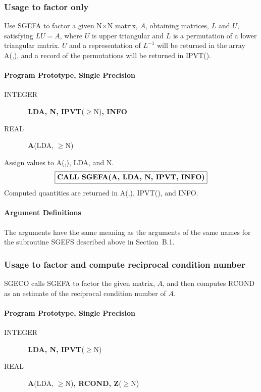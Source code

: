 \documentclass[twoside]{MATH77}
\begin{document}
\subsubsection{Usage to factor only}

Use SGEFA to factor a given N$\times $N matrix, $A$, obtaining matrices, $L$
and $U$, satisfying $LU =A$, where $U$ is upper triangular and $L$ is a
permutation of a lower triangular matrix. $U$ and a representation
of $L^{-1}$ will be returned in the array A(,), and a record of the
permutations will be returned in IPVT().

\paragraph{Program Prototype, Single Precision}

\begin{description}

\item[INTEGER] \ {\bf LDA, N, IPVT}($\geq $N){\bf , INFO}

\item[REAL] \ {\bf A}(LDA, $\geq $N)

\end{description}

Assign values to A(,), LDA, and N.
$$
\fbox{\bf CALL SGEFA(A, LDA, N, IPVT, INFO)}
$$
Computed quantities are returned in A(,), IPVT(), and INFO.

\paragraph{Argument Definitions}

The arguments have the same meaning as the arguments of the same names for
the subroutine SGEFS described above in Section~B.1.

\subsubsection{Usage to factor and compute reciprocal condition number}

SGECO calls SGEFA to factor the given matrix, $A$, and then computes RCOND as
an estimate of the reciprocal condition number of $A$.

\paragraph{Program Prototype, Single Precision}

\begin{description}

\item[INTEGER] \ {\bf LDA, N, IPVT}($\geq $N)

\item[REAL] \ {\bf A}(LDA, $\geq $N){\bf , RCOND, Z}($\geq $N)

\end{description}
\end{document}
